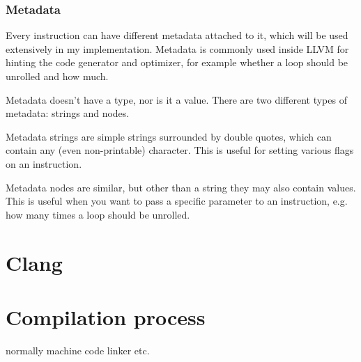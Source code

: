 \subsubsection{Metadata}
Every instruction can have different metadata attached to it, which will be used extensively in my implementation. Metadata is commonly used inside LLVM for hinting the code generator and optimizer, for example whether a loop should be unrolled and how much.

Metadata doesn't have a type, nor is it a value. There are two different types of metadata: strings and nodes.

Metadata strings are simple strings surrounded by double quotes, which can contain any (even non-printable) character. This is useful for setting various flags on an instruction.

Metadata nodes are similar, but other than a string they may also contain values. This is useful when you want to pass a specific parameter to an instruction, e.g. how many times a loop should be unrolled.

\section{Clang}

\section{Compilation process}
normally machine code linker etc.
